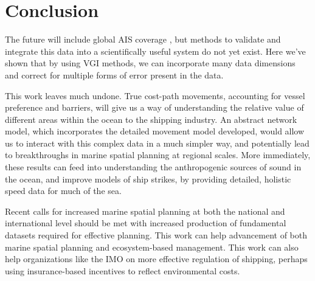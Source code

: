 \documentclass[12pt,letterpaper]{article}
\begin{document}



\section{\textbf{Conclusion}}



The future will include global AIS coverage \citep{JonesGoogle2012,carson2012satellite}, but methods to validate and integrate this data into a scientifically useful system do not yet exist. Here we've shown that by using VGI methods, we can incorporate many data dimensions and correct for multiple forms of error present in the data.

This work leaves much undone. True cost-path movements, accounting for vessel preference and barriers, will give us a way of understanding the relative value of different areas within the ocean to the shipping industry. An abstract network model, which incorporates the detailed movement model developed, would allow us to interact with this complex data in a much simpler way, and potentially lead to breakthroughs in marine spatial planning at regional scales. More immediately, these results can feed into understanding the anthropogenic sources of sound in the ocean, and improve models of ship strikes, by providing detailed, holistic speed data for much of the sea.

Recent calls for increased marine spatial planning at both the national and international level should be met with increased production of fundamental datasets required for effective planning. This work can help advancement of both marine spatial planning and ecosystem-based management. This work can also help organizations like the IMO on more effective regulation of shipping, perhaps using insurance-based incentives to reflect environmental costs.




%

\end{document}
